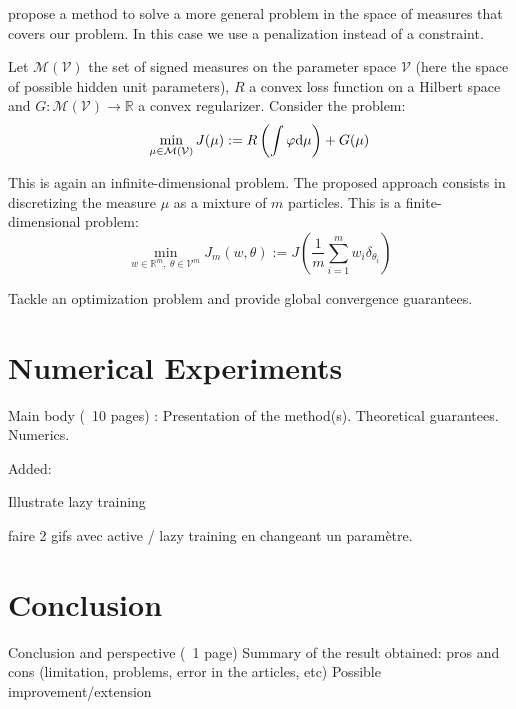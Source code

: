 \documentclass[a4paper, 11pt]{scrartcl}
\begin{document}
\cite{chizat2018global} propose a method to solve a more general problem in the space of measures that covers our problem. In this case we use a penalization instead of a constraint.

Let $\mathcal{M}(\mathcal{V})$ the set of signed measures on the parameter space $\mathcal{V}$ (here the space of possible hidden unit parameters), $R$ a convex loss function on a Hilbert space and $G:\mathcal{M}(\mathcal{V}) \rightarrow \mathbb{R}$ a convex regularizer. Consider the problem:
\begin{equation}
\min_{\mu \in \mathcal{M}(\mathcal{V})} J(\mu):=R\left( \int \varphi \textnormal{d}\mu \right) + G(\mu)
\end{equation}

This is again an infinite-dimensional problem. The proposed approach consists in discretizing the measure $\mu$ as a mixture of $m$ particles. This is a finite-dimensional problem:
\begin{equation}
\min_{w \in \mathbb{R}^m,~\theta \in \mathcal{V}^m} J_m(w, \theta):=J\left(  \frac{1}{m} \sum_{i=1}^m w_i \delta_{\theta_i}\right)
\end{equation}

 Tackle an optimization problem and provide global convergence guarantees. 

\section{Numerical Experiments}

Main body (~10 pages) : 
Presentation of the method(s). 
Theoretical guarantees. 
Numerics. 


Added:

Illustrate lazy training \cite{chizat:hal-01945578}

faire 2 gifs avec active / lazy training en changeant un paramètre.

\section{Conclusion}

Conclusion and perspective (~1 page)
Summary of the result obtained: pros and cons (limitation, problems, error in the articles, etc)
Possible improvement/extension

\newpage



\end{document}
